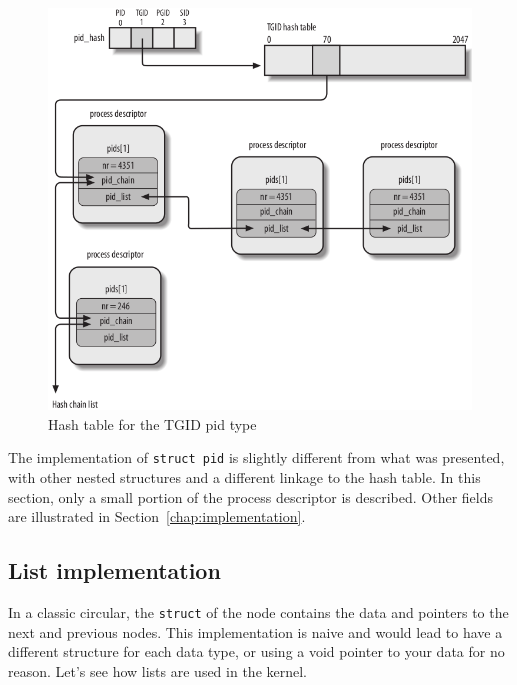 \documentclass[10pt]{book}
\begin{document}
\begin{figure}[ht]
\includegraphics[width=\textwidth]{images/pidhash2.png}
\caption{Hash table for the TGID pid type}
\label{img:pidhash2}
\end{figure}

The implementation of \verb|struct pid| is slightly different from what was presented, with other nested structures and a different linkage to the hash table. %
In this section, only a small portion of the process descriptor is described. Other fields are illustrated in Section~\ref{chap:implementation}.



\subsection{List implementation}
In a classic circular, the \texttt{struct} of the node contains the data and pointers to the next and previous nodes. This implementation is naive and would lead to have a different structure for each data type, or using a void pointer to your data for no reason. Let's see how lists are used in the kernel.
\end{document}
